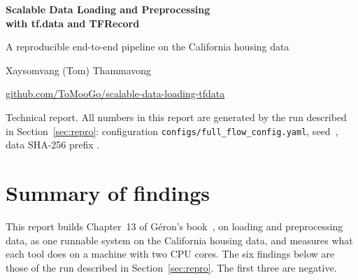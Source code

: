 \documentclass[11pt,a4paper]{article}
\begin{document}
\hypersetup{pageanchor=false}
\begin{titlepage}
\centering
\vspace*{3.5cm}
{\LARGE\bfseries Scalable Data Loading and Preprocessing\\[0.4em] with tf.data and TFRecord\par}
\vspace{1.0cm}
{\large A reproducible end-to-end pipeline on the California housing data\par}
\vspace{1.5cm}
Xaysomvang (Tom) Thammavong\par
\vspace{0.4em}
\href{https://github.com/ToMooGo/scalable-data-loading-tfdata}{github.com/ToMooGo/scalable-data-loading-tfdata}\par
\vfill
{\small Technical report. All numbers in this report are generated by the run described in
Section~\ref{sec:repro}: configuration \texttt{configs/full\_flow\_config.yaml}, seed~\runSeed,
data SHA-256 prefix \texttt{\runDataSha}.\par}
\vspace{1cm}
\end{titlepage}
\hypersetup{pageanchor=true}

\section*{Summary of findings}

This report builds Chapter~13 of Géron's book~\cite{geron}, on loading and preprocessing data, as one runnable system on the California housing data, and measures what each tool does on a machine with two CPU cores. The six findings below are those of the run described in Section~\ref{sec:repro}. The first three are negative.
\end{document}
